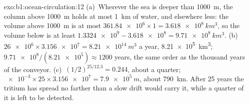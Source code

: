 \begin{solution}{exo:b1:ocean-circulation:12}
(a)~Wherever the sea is deeper than \qty{1000}{m}, the column above \qty{1000}{m}
holds at most \qty{1}{km} of water, and elsewhere less: the volume above
\qty{1000}{m} is at most $\num{361.84e6} \times 1 = \qty{3.618e8}{km^3}$, so the
volume below is at least $\num{1.3324e9} - \num{3.618e8} = \qty{9.71e8}{km^3}$.
(b)~$\num{26e6} \times \num{3.156e7} = \qty{8.21e14}{m^3}$ a year,
\qty{8.21e5}{km^3}; $\num{9.71e8}/(\num{8.21e5}) \approx 1200$ years, the same order as
the thousand years of the conveyor. (c)~$(1/2)^{25/12.3} = 0.244$, about a quarter;
$\num{e-3} \times 25 \times \num{3.156e7} = \qty{7.9e5}{m}$, about \qty{790}{km}.
After 25 years the tritium has spread no farther than a slow drift would carry it,
while a quarter of it is left to be detected.
\end{solution}

